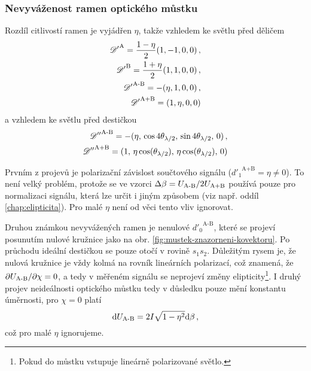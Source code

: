 \subsubsection*{Nevyváženost ramen optického můstku}
Rozdíl citlivostí ramen je vyjádřen $\eta$, takže vzhledem ke světlu před děličem
\begin{align}
    {\mathscr{D}'}^\textrm{A}=\frac{1-\eta}{2}(1, -1, 0, 0) \,,\\
    {\mathscr{D}'}^\textrm{B}=\frac{1+\eta}{2}(1, 1, 0, 0) \,,\\
    {\mathscr{D}'}^\textrm{A-B}=-(\eta, 1, 0, 0) \,,\\
    {\mathscr{D}'}^\textrm{A+B}=(1, \eta, 0, 0) 
\end{align}
a vzhledem ke světlu před destičkou
\begin{align}
    {\mathscr{D}''}^\textrm{A-B}=-(\eta,\, \cos4\theta_{\lambda/2},\, \sin4\theta_{\lambda/2},\, 0) \,,\\
    {\mathscr{D}''}^\textrm{A+B}=(1,\, \eta\cos(\theta_{\lambda/2}),\, \eta\cos(\theta_{\lambda/2}),\, 0) 
\end{align}

Prvním z projevů je polarizační závislost součtového signálu (${d'_1}^\textrm{A+B}=\eta\neq0$).
To není velký problém, protože se ve vzorci $\Delta\beta=U_\textrm{A-B}/2U_\textrm{A+B}$ používá pouze pro normalizaci signálu, která lze určit i jiným způsobem (viz např. oddíl \ref{chap:elipticita}). 
Pro malé $\eta$ není od věci tento vliv ignorovat.

Druhou známkou nevyvážených ramen je nenulové  ${d'_0}^\textrm{A-B}$, které se projeví posunutím nulové kružnice jako na obr. \ref{fig:mustek-znazorneni-kovektoru}. 
Po průchodu ideální destičkou se pouze otočí v rovině $s_1s_2$.
Důležitým rysem je, že nulová kružnice je vždy kolmá na rovník lineárních polarizací, což znamená, že $\partial U_\textrm{A-B}/\partial\chi = 0$, a tedy v měřeném signálu se neprojeví změny elipticity\footnote{Pokud do můstku vstupuje lineárně polarizované světlo.}.
I druhý projev neideálnosti optického můstku tedy v důsledku pouze mění konstantu úměrnosti, pro $\chi=0$ platí
\begin{equation}
    \textrm{d}U_\textrm{A-B} = 2I \sqrt{1-\eta^2} \textrm{d}\beta \,,
\end{equation}
což pro malé $\eta$ ignorujeme.

